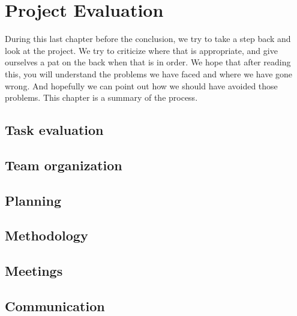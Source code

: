 \section{Project Evaluation}\label{Project Evaluation}
    During this last chapter before the conclusion, we try to take a step back and look at the project. We try to criticize where that is appropriate, and give ourselves a pat on the back when that is in order. We hope that after reading this, you will understand the problems we have faced and where we have gone wrong. And hopefully we can point out how we should have avoided those problems. This chapter is a summary of the process.
    
    \subsection{Task evaluation}
    \label{evaluation:task}
        
        
    \subsection{Team organization}
    \label{evaluation:team organization}
        
        
    \subsection{Planning}
    \label{evaluation:planning}
        
        
    \subsection{Methodology}
    \label{evaluation:methodology}
        
        
    \subsection{Meetings}
    \label{evaluation:meetings}
        
        
    \subsection{Communication}
    \label{evaluation:communication}
        
        
